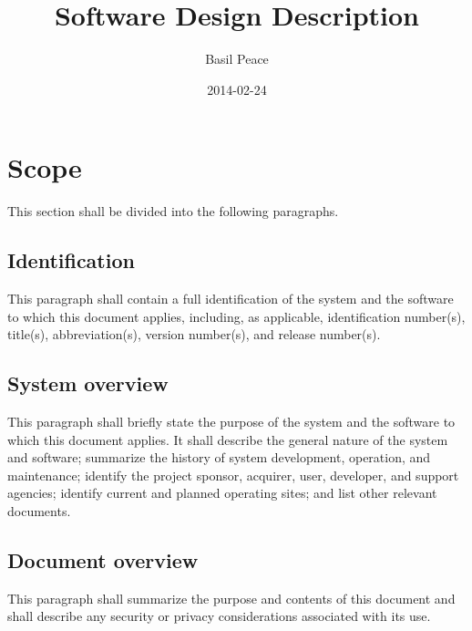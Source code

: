 \documentclass{fidata-report-template}
\begin{document}
\frontmatter

\title{Software Design Description}

\date{2014-02-24}

\author{Basil Peace}

\maketitle
\tableofcontents

\section{Scope}

This section shall be divided into the following paragraphs.

\subsection{Identification}

This paragraph shall contain a full identification of the system and the
software to which this document applies, including, as applicable,
identification number(s), title(s), abbreviation(s), version number(s),
and release number(s).

\subsection{System overview}

This paragraph shall briefly state the purpose of the system and the
software to which this document applies. It shall describe the general
nature of the system and software; summarize the history of system
development, operation, and maintenance; identify the project sponsor,
acquirer, user, developer, and support agencies; identify current and
planned operating sites; and list other relevant documents.

\subsection{Document overview}

This paragraph shall summarize the purpose and contents of this document
and shall describe any security or privacy considerations associated
with its use.

\section{}
\end{document}
